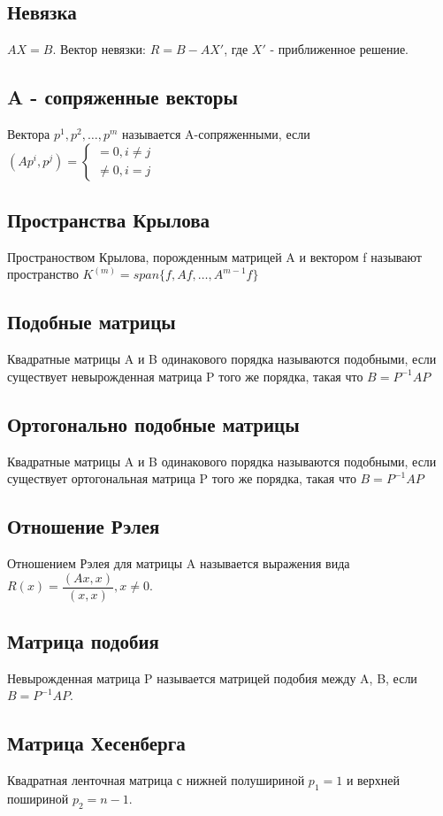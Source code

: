 \documentclass[9pt]{article}
\begin{document}
 	\subsection{Невязка}
 		$AX = B$. Вектор невязки: $R = B - AX'$, где $X'$ - приближенное решение. 
 	\subsection{A - сопряженные векторы}
 		Вектора $p^1, p^2, \dots, p^m$ называется A-сопряженными, если $(Ap^i, p^j) = \begin{cases}
 			= 0, i \neq j \\
 			\neq 0, i = j
 		\end{cases}$
 	\subsection{Пространства Крылова}
 		Пространоством Крылова, порожденным матрицей A и вектором f называют пространство $K^{(m)} = span\{f, Af, \dots , A^{m-1}f\}$
 	\subsection{Подобные матрицы}
 	Квадратные матрицы A и B одинакового порядка называются подобными, если существует невырожденная матрица P того же порядка, такая что $B = P^{-1} A P$
 	\subsection{Ортогонально подобные матрицы}
 		Квадратные матрицы A и B одинакового порядка называются подобными, если существует ортогональная матрица P того же порядка, такая что $B = P^{-1} A P$
 	\subsection{Отношение Рэлея}
 		Отношением Рэлея для матрицы A называется выражения вида \newline $R(x) = \dfrac{(Ax,x)}{(x,x)}, x \neq 0$.
 	\subsection{Матрица подобия}
 		Невырожденная матрица P называется матрицей подобия между A, B, если $B = P^{-1} A P$.
 	\subsection{Матрица Хесенберга}
 		Квадратная ленточная матрица с нижней полушириной $p_1 = 1$ и верхней пошириной $p_2 = n-1$. 
\end{document}
